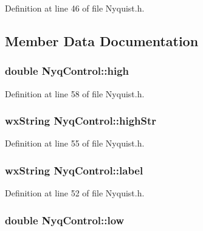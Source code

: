 Definition at line 46 of file Nyquist.\+h.



\subsection{Member Data Documentation}
\subsubsection[{\texorpdfstring{high}{high}}]{\setlength{\rightskip}{0pt plus 5cm}double Nyq\+Control\+::high}\hypertarget{class_nyq_control_a29bf657124097d83e401230f06b152a7}{}\label{class_nyq_control_a29bf657124097d83e401230f06b152a7}


Definition at line 58 of file Nyquist.\+h.

\subsubsection[{\texorpdfstring{high\+Str}{highStr}}]{\setlength{\rightskip}{0pt plus 5cm}wx\+String Nyq\+Control\+::high\+Str}\hypertarget{class_nyq_control_a0134301593f9fe8fa29240273e9c759c}{}\label{class_nyq_control_a0134301593f9fe8fa29240273e9c759c}


Definition at line 55 of file Nyquist.\+h.

\subsubsection[{\texorpdfstring{label}{label}}]{\setlength{\rightskip}{0pt plus 5cm}wx\+String Nyq\+Control\+::label}\hypertarget{class_nyq_control_a3a5f36bca932d5109e3086b11591e85a}{}\label{class_nyq_control_a3a5f36bca932d5109e3086b11591e85a}


Definition at line 52 of file Nyquist.\+h.

\subsubsection[{\texorpdfstring{low}{low}}]{\setlength{\rightskip}{0pt plus 5cm}double Nyq\+Control\+::low}\hypertarget{class_nyq_control_ac2d35c2008ae1b760eb2336f55e68d60}{}\label{class_nyq_control_ac2d35c2008ae1b760eb2336f55e68d60}


